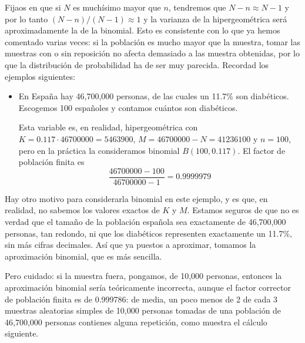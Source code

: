 \documentclass[
  spanish,
  letterpaper,
  DIV=11,
  numbers=noendperiod]{scrreprt}
\begin{document}
Fijaos en que si \(N\) es muchísimo mayor que \(n\), tendremos que
\(N-n \approx N-1\) y por lo tanto \((N-n)/(N-1)\approx 1\) y la
varianza de la hipergeométrica será aproximadamente la de la binomial.
Esto es consistente con lo que ya hemos comentado varias veces: si la
población es mucho mayor que la muestra, tomar las muestras con o sin
reposición no afecta demasiado a las muestra obtenidas, por lo que la
distribución de probabilidad ha de ser muy parecida. Recordad los
ejemplos siguientes:

\begin{itemize}
\item
  En España hay 46,700,000 personas, de las cuales un 11.7\% son
  diabéticos. Escogemos 100 españoles y contamos cuántos son diabéticos.

  Esta variable es, en realidad, hipergeométrica con
  \(K=0.117\cdot 46700000=5463900\), \(M=46700000-N=41236100\) y
  \(n=100\), pero en la práctica la consideramos binomial
  \(B(100,0.117)\). El factor de población finita es \[
  \frac{46700000-100}{46700000-1}=0.9999979
  \]
\end{itemize}

\begin{tcolorbox}[enhanced jigsaw, arc=.35mm, bottomrule=.15mm, bottomtitle=1mm, breakable, colback=white, colbacktitle=quarto-callout-note-color!10!white, colframe=quarto-callout-note-color-frame, coltitle=black, left=2mm, leftrule=.75mm, opacityback=0, opacitybacktitle=0.6, rightrule=.15mm, title=\textcolor{quarto-callout-note-color}{\faInfo}\hspace{0.5em}{Nota}, titlerule=0mm, toprule=.15mm, toptitle=1mm]

Hay otro motivo para considerarla binomial en este ejemplo, y es que, en
realidad, no sabemos los valores exactos de \(K\) y \(M\). Estamos
seguros de que no es verdad que el tamaño de la población española sea
exactamente de 46,700,000 personas, tan redondo, ni que los diabéticos
representen exactamente un 11.7\%, sin más cifras decimales. Así que ya
puestos a aproximar, tomamos la aproximación binomial, que es más
sencilla.

Pero cuidado: si la muestra fuera, pongamos, de 10,000 personas,
entonces la aproximación binomial sería teóricamente incorrecta, aunque
el factor corrector de población finita es de 0.999786: de media, un
poco menos de 2 de cada 3 muestras aleatorias simples de 10,000 personas
tomadas de una población de 46,700,000 personas contienes alguna
repetición, como muestra el cálculo siguiente.

\end{tcolorbox}
\end{document}
